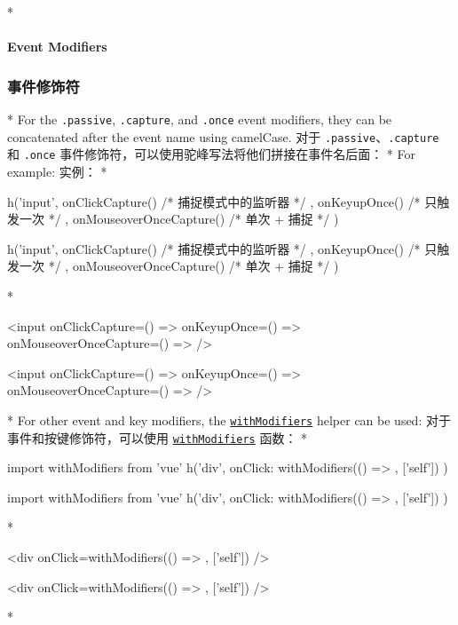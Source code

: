 \begin{paracol}{2} 
 
\switchcolumn[0]*%
\paragraph{Event Modifiers}
\switchcolumn
\subsubsection{事件修饰符}
\switchcolumn[0]*%
For the \texttt{.passive}, \texttt{.capture}, and \texttt{.once} event
modifiers, they can be concatenated after the event name using
camelCase.
\switchcolumn
对于 \texttt{.passive}、\texttt{.capture} 和 \texttt{.once}
事件修饰符，可以使用驼峰写法将他们拼接在事件名后面：
\switchcolumn[0]*%
For example:
\switchcolumn
实例：
\switchcolumn[0]*%
\begin{codeJs}
h('input', {
  onClickCapture() {
    /* 捕捉模式中的监听器 */
  },
  onKeyupOnce() {
    /* 只触发一次 */
  },
  onMouseoverOnceCapture() {
    /* 单次 + 捕捉 */
  }
})
\end{codeJs}
\switchcolumn
\begin{codeJs}
h('input', {
  onClickCapture() {
    /* 捕捉模式中的监听器 */
  },
  onKeyupOnce() {
    /* 只触发一次 */
  },
  onMouseoverOnceCapture() {
    /* 单次 + 捕捉 */
  }
})
\end{codeJs}
\switchcolumn[0]*%
\begin{codeHtml}
<input
  onClickCapture={() => {}}
  onKeyupOnce={() => {}}
  onMouseoverOnceCapture={() => {}}
/>
\end{codeHtml}
\switchcolumn
\begin{codeHtml}
<input
  onClickCapture={() => {}}
  onKeyupOnce={() => {}}
  onMouseoverOnceCapture={() => {}}
/>
\end{codeHtml}
\switchcolumn[0]*%
For other event and key modifiers, the
\href{https://vuejs.org/api/render-function.html\#withmodifiers}{\texttt{withModifiers}}
helper can be used:
\switchcolumn
对于事件和按键修饰符，可以使用
\href{https://cn.vuejs.org/api/render-function.html\#withmodifiers}{\texttt{withModifiers}}
函数：
\switchcolumn[0]*%
\begin{codeJs}
import { withModifiers } from 'vue'
h('div', {
  onClick: withModifiers(() => {}, ['self'])
})
\end{codeJs}
\switchcolumn
\begin{codeJs}
import { withModifiers } from 'vue'
h('div', {
  onClick: withModifiers(() => {}, ['self'])
})
\end{codeJs}
\switchcolumn[0]*%
\begin{codeHtml}
<div onClick={withModifiers(() => {}, ['self'])} />
\end{codeHtml}
\switchcolumn
\begin{codeHtml}
<div onClick={withModifiers(() => {}, ['self'])} />
\end{codeHtml}
\switchcolumn[0]*%

\end{paracol}
